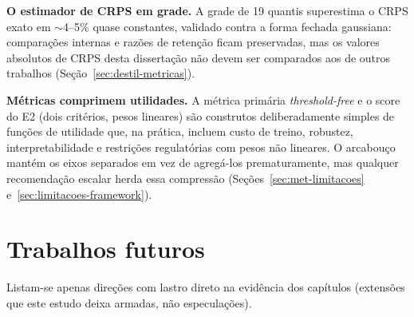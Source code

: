 \textbf{O estimador de CRPS em grade.} A grade de 19 quantis
superestima o CRPS exato em ${\sim}$4--5\% quase constantes, validado
contra a forma fechada gaussiana: comparações internas e razões de
retenção ficam preservadas, mas os valores absolutos de CRPS desta
dissertação não devem ser comparados aos de outros trabalhos
(Seção~\ref{sec:destil-metricas}).

\textbf{Métricas comprimem utilidades.} A métrica primária
\emph{threshold-free} e o score do E2 (dois critérios, pesos lineares)
são construtos deliberadamente simples de funções de utilidade que, na
prática, incluem custo de treino, robustez, interpretabilidade e
restrições regulatórias com pesos não lineares. O arcabouço mantém os
eixos separados em vez de agregá-los prematuramente, mas qualquer
recomendação escalar herda essa compressão
(Seções~\ref{sec:met-limitacoes} e~\ref{sec:limitacoes-framework}).

\section{Trabalhos futuros}
\label{sec:conc-futuros}

Listam-se apenas direções com lastro direto na evidência dos capítulos
(extensões que este estudo deixa armadas, não especulações).

